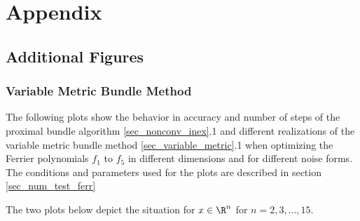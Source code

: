 \section{Appendix}

\subsection{Additional Figures}

\subsubsection{Variable Metric Bundle Method}

The following plots show the behavior in accuracy and number of steps of the proximal bundle algorithm \ref{sec_nonconv_inex}.1 and different realizations of the variable metric bundle method \ref{sec_variable_metric}.1 when optimizing the Ferrier polynomials \(f_1\) to \(f_5\) in different dimensions and for different noise forms.
The conditions and parameters used for the plots are described in section \ref{sec_num_test_ferr}

The two plots below depict the situation for \(x \in \R^n\) for \(n = 2,3,...,15\).


